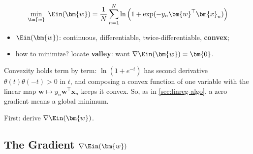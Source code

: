 \[
    \min_{\bm{w}} \; \Ein(\bm{w}) = \frac{1}{N} \sum_{n=1}^N \ln \left( 1 +
    \exp(-y_n \bm{w}^\top \bm{x}_n) \right)
\]

\begin{center}
    \begin{minipage}[c]{0.3\textwidth}
        \centering
    \end{minipage}%
    \begin{minipage}[c]{0.66\textwidth}
        \begin{itemize}
            \item \(\Ein(\bm{w})\): continuous, differentiable,
                twice-differentiable, \textbf{convex};
            \item how to minimize? locate \textbf{valley}: want \(\nabla
                \Ein(\bm{w}) = \bm{0}\).
        \end{itemize}
    \end{minipage}
\end{center}

Convexity holds term by term: \(\ln(1 + e^{-t})\) has second derivative
\(\theta(t) \theta(-t) > 0\) in \(t\), and composing a convex function of one
variable with the linear map \(\bm{w} \mapsto y_n \bm{w}^\top \bm{x}_n\) keeps
it convex. So, as in \autoref{sec:linreg-algo}, a zero gradient means a global
minimum.

\begin{moral}
    First: derive \(\nabla \Ein(\bm{w})\).
\end{moral}

\subsection{The Gradient \texorpdfstring{\(\nabla \Ein(\bm{w})\)}{of Ein}}


